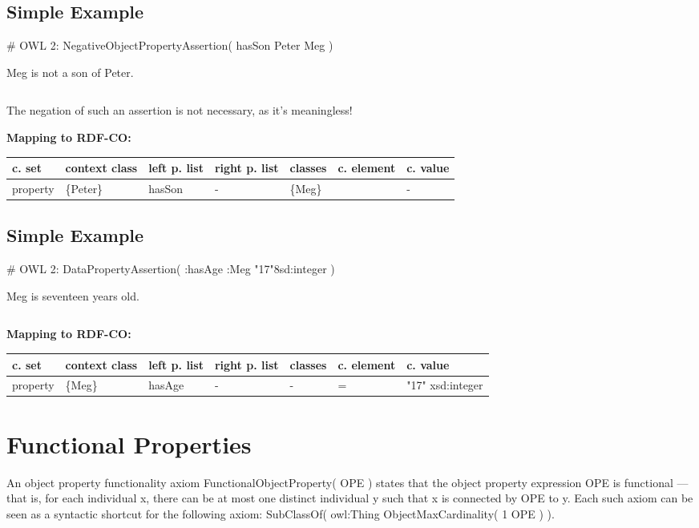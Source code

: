 \documentclass{llncs}
\newenvironment{gcotable}{
  \scriptsize
  \sffamily
  \vspace{0cm}
	\begin{center}
	\textbf{\vspace{0.4cm}Mapping to RDF-CO:} \\
  \begin{tabular}{l|l|l|l|l|l|l}
	\hline
  \textbf{c. set} & \textbf{context class} & \textbf{left p. list} & \textbf{right p. list} & \textbf{classes} & \textbf{c. element} & \textbf{c. value} \\
  \hline

}{
  \hline
  \end{tabular}
	\end{center}
}
\newenvironment{DL}{
\vspace{0cm}
	\begin{center}
  \begin{tabular}{r l}

}{
  \end{tabular}
	\end{center}
}
\begin{document}
\subsection{Simple Example}

\begin{ex}
# OWL 2:
NegativeObjectPropertyAssertion( hasSon Peter Meg )
\end{ex}

Meg is not a son of Peter.

\begin{DL}
\\
\end{DL}

The negation of such an assertion is not necessary, as it's meaningless!

\begin{gcotable}
property & \{Peter\} & hasSon & - & \{Meg\} &  & - \\
\end{gcotable}

\subsection{Simple Example}

\begin{ex}
# OWL 2:
DataPropertyAssertion( :hasAge :Meg "17"^^xsd:integer )
\end{ex}

Meg is seventeen years old. 

\begin{DL}
\\
\end{DL}

\begin{gcotable}
property & \{Meg\} & hasAge & - & - & = & "17" xsd:integer \\
\end{gcotable}

\section{Functional Properties}

An object property functionality axiom FunctionalObjectProperty( OPE ) states that the object property expression OPE is functional — that is, for each individual x, there can be at most one distinct individual y such that x is connected by OPE to y. Each such axiom can be seen as a syntactic shortcut for the following axiom: SubClassOf( owl:Thing ObjectMaxCardinality( 1 OPE ) ).
\end{document}
